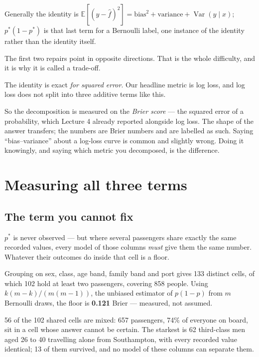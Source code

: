 \documentclass[11pt,a4paper]{article}
\begin{document}
Generally the identity is $\mathbb{E}[(y-\hat f)^2] = \text{bias}^2 +
\text{variance} + \operatorname{Var}(y \mid x)$; $p^{*}(1-p^{*})$ is that last
term for a Bernoulli label, one instance of the identity rather than the
identity itself.

The first two repairs point in opposite directions. That is the whole
difficulty, and it is why it is called a trade-off.

\begin{failbox}[title={Failure condition --- an honest caveat before we measure anything}]
The identity is exact \emph{for squared error}. Our headline metric is log
loss, and log loss does not split into three additive terms like this.

So the decomposition is measured on the \emph{Brier score} --- the squared
error of a probability, which Lecture 4 already reported alongside log loss.
The shape of the answer transfers; the numbers are Brier numbers and are
labelled as such. Saying ``bias--variance'' about a log-loss curve is common
and slightly wrong. Doing it knowingly, and saying which metric you
decomposed, is the difference.
\end{failbox}

\section{Measuring all three terms}

\subsection{The term you cannot fix}

$p^{*}$ is never observed --- but where several passengers share exactly the
same recorded values, every model of those columns \emph{must} give them the
same number. Whatever their outcomes do inside that cell is a floor.

Grouping on sex, class, age band, family band and port gives 133 distinct
cells, of which 102 hold at least two passengers, covering 858 people. Using
$k(m-k)/(m(m-1))$, the unbiased estimator of $p(1-p)$ from $m$ Bernoulli draws,
the floor is \textbf{0.121} Brier --- measured, not assumed.

56 of the 102 shared cells are mixed: 657 passengers, 74\% of everyone on
board, sit in a cell whose answer cannot be certain. The starkest is 62
third-class men aged 26 to 40 travelling alone from Southampton, with every
recorded value identical; 13 of them survived, and no model of these columns
can separate them.
\end{document}
